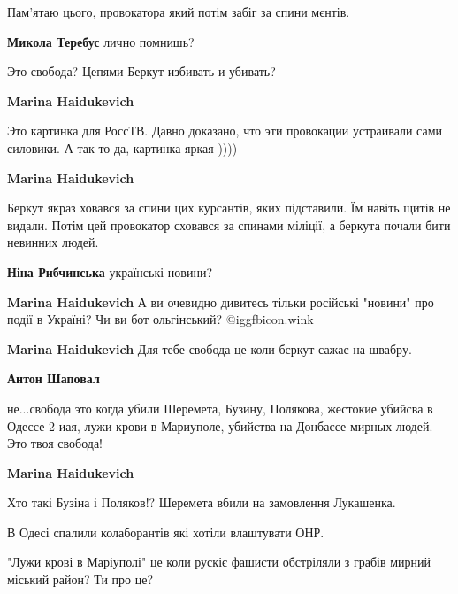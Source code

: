  
 
 
 
 

\begin{multicols}{2}

Пам'ятаю цього, провокатора який потім забіг за спини мєнтів.

\textbf{Микола Теребус} лично помнишь?

Это свобода? Цепями Беркут избивать и убивать?

\textbf{Marina Haidukevich} 

Это картинка для РоссТВ. Давно доказано, что эти провокации устраивали сами
силовики. А так-то да, картинка яркая ))))

\textbf{Marina Haidukevich}

Беркут якраз ховався за спини цих курсантів, яких підставили. Їм навіть щитів
не видали. Потім цей провокатор сховався за спинами міліції, а беркута почали
бити невинних людей.

\textbf{Ніна Рибчинська} українські новини?

\textbf{Marina Haidukevich}
А ви очевидно дивитесь тільки російські "новини" про події в Україні? Чи ви бот ольгінський?  @igg{fbicon.wink} 

\textbf{Marina Haidukevich} Для тебе свобода це коли бєркут сажає на швабру.

\textbf{Антон Шаповал} 

не...свобода это когда убили Шеремета, Бузину, Полякова, жестокие убийсва в
Одессе 2 иая, лужи крови в Мариуполе, убийства на Донбассе мирных людей. Это
твоя свобода!

\textbf{Marina Haidukevich} 

Хто такі Бузіна і Поляков!? Шеремета вбили на замовлення Лукашенка.

В Одесі спалили колаборантів які хотіли влаштувати ОНР.

"Лужи крові в Маріуполі" це коли рускіє фашисти обстріляли з грабів мирний
міський район? Ти про це?


\end{multicols}
